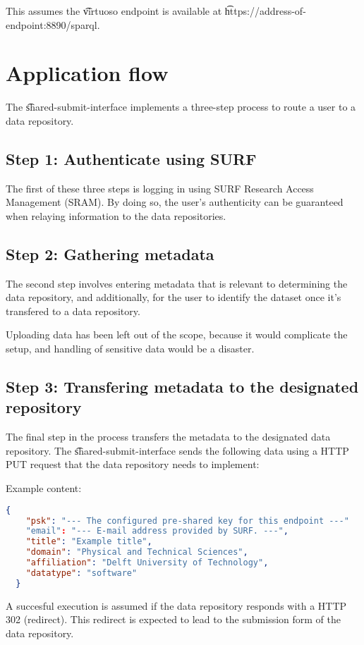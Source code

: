This assumes the \t{virtuoso} endpoint is available at
\t{https://address-of-endpoint:8890/sparql}.

\section{Application flow}

The \t{shared-submit-interface} implements a three-step process to route a
user to a data repository.

\subsection{Step 1: Authenticate using SURF}

The first of these three steps is logging in using SURF Research Access
Management (SRAM).  By doing so, the user's authenticity can be guaranteed
when relaying information to the data repositories.

\subsection{Step 2: Gathering metadata}

The second step involves entering metadata that is relevant to determining
the data repository, and additionally, for the user to identify the dataset
once it's transfered to a data repository.

Uploading data has been left out of the scope, because it would complicate
the setup, and handling of sensitive data would be a disaster.

\subsection{Step 3: Transfering metadata to the designated repository}

The final step in the process transfers the metadata to the designated
data repository.  The \t{shared-submit-interface} sends the following
data using a HTTP PUT request that the data repository needs to
implement:

Example content:
\begin{lstlisting}[language=json]
  {
    "psk": "--- The configured pre-shared key for this endpoint ---"
    "email": "--- E-mail address provided by SURF. ---",
    "title": "Example title",
    "domain": "Physical and Technical Sciences",
    "affiliation": "Delft University of Technology",
    "datatype": "software"
  }
\end{lstlisting}

A succesful execution is assumed if the data repository responds with
a HTTP 302 (redirect).  This redirect is expected to lead to the
submission form of the data repository.
